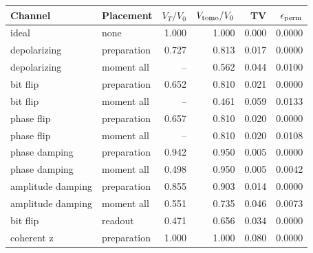 \begin{tabular}{llrrrr}
\toprule
Channel & Placement & $V_T/V_0$ & $V_{\rm tomo}/V_0$ & TV & $\epsilon_{\rm perm}$ \\
\midrule
ideal & none & 1.000 & 1.000 & 0.000 & 0.0000 \\
depolarizing & preparation & 0.727 & 0.813 & 0.017 & 0.0000 \\
depolarizing & moment all & -- & 0.562 & 0.044 & 0.0100 \\
bit flip & preparation & 0.652 & 0.810 & 0.021 & 0.0000 \\
bit flip & moment all & -- & 0.461 & 0.059 & 0.0133 \\
phase flip & preparation & 0.657 & 0.810 & 0.020 & 0.0000 \\
phase flip & moment all & -- & 0.810 & 0.020 & 0.0108 \\
phase damping & preparation & 0.942 & 0.950 & 0.005 & 0.0000 \\
phase damping & moment all & 0.498 & 0.950 & 0.005 & 0.0042 \\
amplitude damping & preparation & 0.855 & 0.903 & 0.014 & 0.0000 \\
amplitude damping & moment all & 0.551 & 0.735 & 0.046 & 0.0073 \\
bit flip & readout & 0.471 & 0.656 & 0.034 & 0.0000 \\
coherent z & preparation & 1.000 & 1.000 & 0.080 & 0.0000 \\
\bottomrule
\end{tabular}
